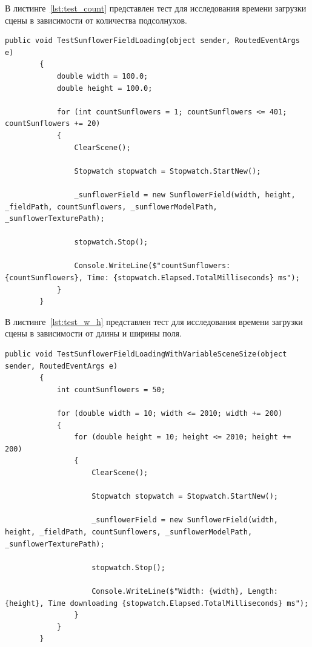 В листинге~\ref{lst:test_count} представлен тест для исследования времени загрузки сцены в зависимости от количества подсолнухов.
\begin{center}
\begin{lstlisting}[caption={Тест для исследования времени загрузки сцены в зависимости от количества подсолнухов}, label={lst:test_count}]
public void TestSunflowerFieldLoading(object sender, RoutedEventArgs e)
        {
            double width = 100.0;
            double height = 100.0;

            for (int countSunflowers = 1; countSunflowers <= 401; countSunflowers += 20)
            {
                ClearScene();

                Stopwatch stopwatch = Stopwatch.StartNew();

                _sunflowerField = new SunflowerField(width, height, _fieldPath, countSunflowers, _sunflowerModelPath, _sunflowerTexturePath);
                
                stopwatch.Stop();

                Console.WriteLine($"countSunflowers: {countSunflowers}, Time: {stopwatch.Elapsed.TotalMilliseconds} ms");
            }
        }
\end{lstlisting}
\end{center}


В листинге~\ref{lst:test_w_h} представлен тест для исследования времени загрузки сцены в зависимости от длины и ширины поля.
\begin{center}
\begin{lstlisting}[caption={Тест для исследования времени загрузки сцены в зависимости от длины и ширины поля}, label={lst:test_w_h}]
public void TestSunflowerFieldLoadingWithVariableSceneSize(object sender, RoutedEventArgs e)
        {
            int countSunflowers = 50; 

            for (double width = 10; width <= 2010; width += 200)
            {
                for (double height = 10; height <= 2010; height += 200)
                {
                    ClearScene();

                    Stopwatch stopwatch = Stopwatch.StartNew();

                    _sunflowerField = new SunflowerField(width, height, _fieldPath, countSunflowers, _sunflowerModelPath, _sunflowerTexturePath);

                    stopwatch.Stop();

                    Console.WriteLine($"Width: {width}, Length: {height}, Time downloading {stopwatch.Elapsed.TotalMilliseconds} ms");
                }
            }
        }
\end{lstlisting}
\end{center}


